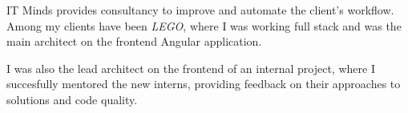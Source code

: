
IT Minds provides consultancy to improve and automate the client's workflow. Among my clients have
been \emph{LEGO}, where I was working full stack and was the main architect on the frontend Angular
application.

\medskip

I was also the lead architect on the frontend of an internal project, where I succesfully mentored
the new interns, providing feedback on their approaches to solutions and code quality.

%

